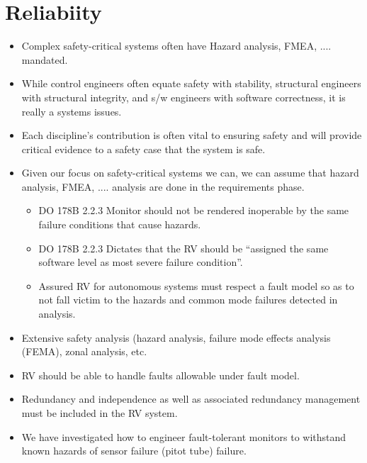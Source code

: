 \section{Reliabiity}\label{sec:ft}

\noindent{}


\noindent{}

\begin{itemize} 
\item Complex safety-critical systems often have Hazard analysis,
  FMEA, .... mandated.
\item  While control engineers often
  equate safety with stability, structural engineers with structural
  integrity, and  s/w engineers with software correctness, it is
  really a systems issues. 
\item Each discipline's contribution is often vital to ensuring safety
  and will provide critical evidence to a safety case that the
  system is safe. 
\item Given our focus on safety-critical systems we can, we can assume
  that hazard analysis, FMEA, .... analysis are done in the
  requirements phase.
\begin{itemize}
\item DO 178B 2.2.3 Monitor should not be rendered inoperable by the
  same failure conditions that cause hazards.
\item DO 178B 2.2.3  Dictates that the RV should be ``assigned the
  same software level as most severe failure condition''.
\item Assured RV for autonomous systems must respect a fault model so
  as to not fall victim to the hazards and common mode failures
  detected in analysis. 
\end{itemize}
\item Extensive safety analysis (hazard analysis, failure mode effects
  analysis (FEMA), zonal analysis, etc. 
\item RV should be able to handle faults allowable under fault model.
\item Redundancy and independence as well as associated redundancy
  management must be included in the RV system.
\item We have investigated how to engineer fault-tolerant monitors to
  withstand known hazards of sensor failure (pitot tube) failure. 

\end{itemize}
